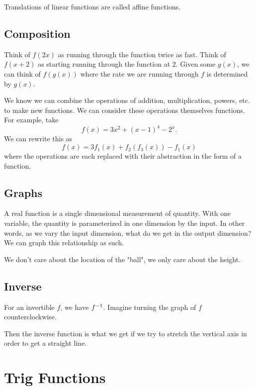\documentclass[../main.tex]{subfiles}
\begin{document}
Translations of linear functions are called affine functions.

\subsection{Composition}

Think of \( f(2x) \) as running through the function twice as fast.
Think of \( f(x + 2) \) as starting running through the function at 2.
Given some \( g(x) \), we can think of \( f(g(x)) \)
where the rate we are running through \( f \) is determined by \( g(x) \).

We know we can combine the operations of addition, multiplication, powers, etc.
to make new functions.
We can consider these operations themselves functions.
For example, take
\[ f(x) = 3x^2 + (x - 1)^4 - 2^x. \]
We can rewrite this as
\[ f(x) = 3f_1(x) + f_2(f_3(x)) - f_1(x) \]
where the operations are each replaced with their abstraction in the form of a function.

\subsection{Graphs}

A real function is a single dimensional measurement of quantity.
With one variable, the quantity is parameterized in one dimension by the input.
In other words, as we vary the input dimension, what do we get in the output dimension?
We can graph this relationship as such.





We don't care about the location of the "ball", we only care about the height.


\subsection{Inverse}

For an invertible \( f \), we have \( f^{-1} \).
Imagine turning the graph of \( f \) counterclockwise.



Then the inverse function is what we get if we try to stretch the vertical axis
in order to get a straight line.



\newpage
\section{Trig Functions}
\end{document}
